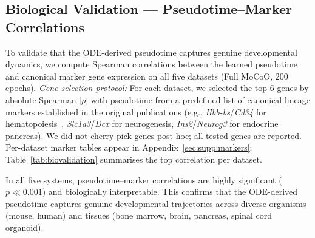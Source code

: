 \documentclass[biology,article,submit,pdftex]{Definitions/mdpi}
\begin{document}
\subsection{Biological Validation --- Pseudotime--Marker Correlations}
\label{sec:results:bio}

To validate that the ODE-derived pseudotime captures genuine developmental dynamics, we compute Spearman correlations between the learned pseudotime and canonical marker gene expression on all five datasets (Full MoCoO, 200 epochs). \textit{Gene selection protocol:} For each dataset, we selected the top 6 genes by absolute Spearman $|\rho|$ with pseudotime from a predefined list of canonical lineage markers established in the original publications (e.g., \textit{Hbb-bs}/\textit{Cd34} for hematopoiesis~\cite{paul2015transcriptional}, \textit{Slc1a3}/\textit{Dcx} for neurogenesis, \textit{Ins2}/\textit{Neurog3} for endocrine pancreas). We did not cherry-pick genes post-hoc; all tested genes are reported. Per-dataset marker tables appear in Appendix~\ref{sec:supp:markers}; Table~\ref{tab:biovalidation} summarises the top correlation per dataset.

\begin{table}[!t]
    \centering
    \caption{Biovalidation summary across all five datasets (Full MoCoO, 200 epochs).}
    \label{tab:biovalidation}
\end{table}

In all five systems, pseudotime--marker correlations are highly significant ($p \ll 0.001$) and biologically interpretable. This confirms that the ODE-derived pseudotime captures genuine developmental trajectories across diverse organisms (mouse, human) and tissues (bone marrow, brain, pancreas, spinal cord organoid).
\end{document}
